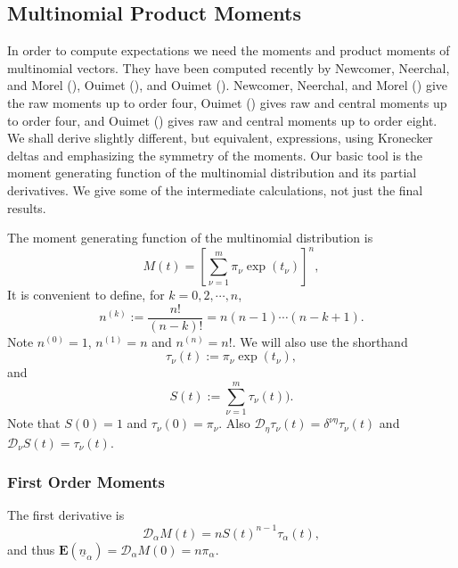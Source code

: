 \documentclass[
  12pt,
  letterpaper,
  DIV=11,
  numbers=noendperiod]{scrartcl}
\newcommand{\ul}[1]{\underline{#1}}
\begin{document}
\subsection{Multinomial Product
Moments}\label{multinomial-product-moments}

In order to compute expectations we need the moments and product moments
of multinomial vectors. They have been computed recently by Newcomer,
Neerchal, and Morel (),
Ouimet (), and Ouimet
(). Newcomer, Neerchal, and Morel
() give the raw moments
up to order four, Ouimet () gives raw and
central moments up to order four, and Ouimet
() gives raw and central moments up to
order eight. We shall derive slightly different, but equivalent,
expressions, using Kronecker deltas and emphasizing the symmetry of the
moments. Our basic tool is the moment generating function of the
multinomial distribution and its partial derivatives. We give some of
the intermediate calculations, not just the final results.

The moment generating function of the multinomial distribution is
\begin{equation}
M(t)=\left[\sum_{\nu=1}^m\pi_\nu\exp(t_\nu)\right]^n,\label{eq-mgf}
\end{equation} It is convenient to define, for \(k=0,2,\cdots,n\),
\begin{equation}
n^{(k)}:=\frac{n!}{(n-k)!}=n(n-1)\cdots(n-k+1).\label{eq-nk}
\end{equation} Note \(n^{(0)}=1\), \(n^{(1)}=n\) and \(n^{(n)}=n!\). We
will also use the shorthand \[
\tau_\nu(t):=\pi_\nu\exp(t_\nu),
\] and \begin{equation}
S(t):=\sum_{\nu=1}^m\tau_\nu(t)).\label{eq-ds}
\end{equation} Note that \(S(0)=1\) and \(\tau_\nu(0)=\pi_\nu\). Also
\(\mathcal{D}_\eta\tau_\nu(t)=\delta^{\nu\eta}\tau_\nu(t)\) and
\(\mathcal{D}_\nu S(t)=\tau_\nu(t)\).

\subsubsection{First Order Moments}\label{first-order-moments}

The first derivative is \begin{equation}
\mathcal{D}_\alpha M(t)=nS(t)^{n-1}\tau_\alpha(t),\label{eq-d1}
\end{equation} and thus
\(\mathbf{E}(\ul{n}_\alpha)=\mathcal{D}_\alpha M(0)=n\pi_\alpha\).
\end{document}
